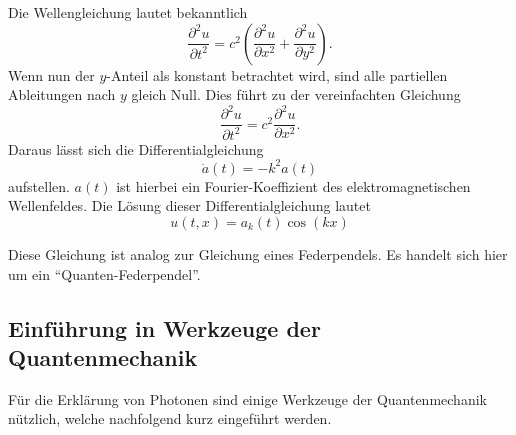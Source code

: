Die Wellengleichung lautet bekanntlich
\begin{equation}
    \frac{\partial^2 u}{\partial t^2} = c^2 \left( \frac{\partial^2 u}{\partial x^2} + \frac{\partial^2 u}{\partial y^2} \right).
\end{equation}
Wenn nun der $y$-Anteil als konstant betrachtet wird, sind alle partiellen Ableitungen nach $y$ gleich Null.
Dies führt zu der vereinfachten Gleichung
\begin{equation}
    \frac{\partial^2 u}{\partial t^2} = c^2 \frac{\partial^2 u}{\partial x^2}.
\end{equation}
Daraus lässt sich die Differentialgleichung
\begin{equation}
    \ddot{a}(t) = -k^2 a(t)
\end{equation}
aufstellen.
$a(t)$ ist hierbei ein Fourier-Koeffizient des elektromagnetischen Wellenfeldes.
Die Lösung dieser Differentialgleichung lautet
\begin{equation}
    u(t,x) = a_k(t) \cos(kx)
\end{equation}






Diese Gleichung ist analog zur Gleichung eines Federpendels.
Es handelt sich hier um ein ``Quanten-Federpendel''.    

\subsection{Einführung in Werkzeuge der Quantenmechanik\label{fourier:subsection:werkzeugeQuantenmechanik}}
Für die Erklärung von Photonen sind einige Werkzeuge der Quantenmechanik nützlich, welche nachfolgend kurz eingeführt werden.

